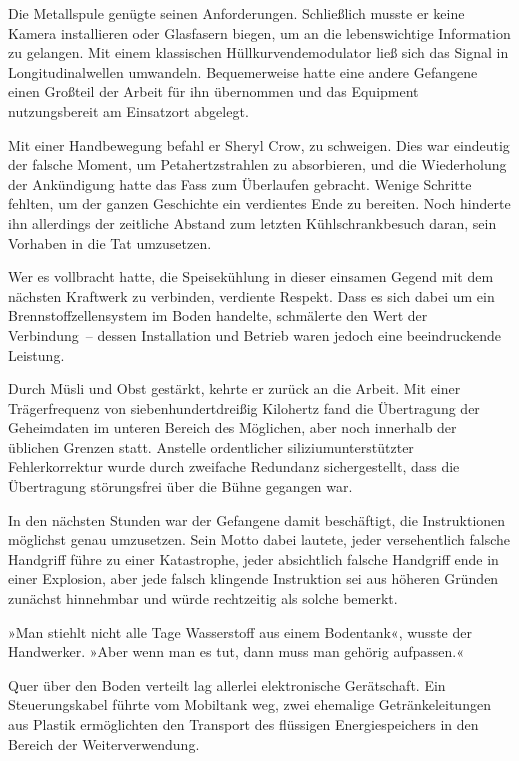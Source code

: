 Die Metallspule genügte seinen Anforderungen. Schließlich musste er keine Kamera installieren oder Glasfasern biegen, um an die lebenswichtige Information zu gelangen. Mit einem klassischen Hüllkurvendemodulator ließ sich das Signal in Longitudinalwellen umwandeln. Bequemerweise hatte eine andere Gefangene einen Großteil der Arbeit für ihn übernommen und das Equipment nutzungsbereit am Einsatzort abgelegt.

Mit einer Handbewegung befahl er Sheryl Crow, zu schweigen. Dies war eindeutig der falsche Moment, um Petahertzstrahlen zu absorbieren, und die Wiederholung der Ankündigung hatte das Fass zum Überlaufen gebracht. Wenige Schritte fehlten, um der ganzen Geschichte ein verdientes Ende zu bereiten. Noch hinderte ihn allerdings der zeitliche Abstand zum letzten Kühlschrankbesuch daran, sein Vorhaben in die Tat umzusetzen.

Wer es vollbracht hatte, die Speisekühlung in dieser einsamen Gegend mit dem nächsten Kraftwerk zu verbinden, verdiente Respekt. Dass es sich dabei um ein Brennstoffzellensystem im Boden handelte, schmälerte den Wert der Verbindung~– dessen Installation und Betrieb waren jedoch eine beeindruckende Leistung.

Durch Müsli und Obst gestärkt, kehrte er zurück an die Arbeit. Mit einer Trägerfrequenz von siebenhundertdreißig Kilohertz fand die Übertragung der Geheimdaten im unteren Bereich des Möglichen, aber noch innerhalb der üblichen Grenzen statt. Anstelle ordentlicher siliziumunterstützter Fehlerkorrektur wurde durch zweifache Redundanz sichergestellt, dass die Übertragung störungsfrei über die Bühne gegangen war.

In den nächsten Stunden war der Gefangene damit beschäftigt, die Instruktionen möglichst genau umzusetzen. Sein Motto dabei lautete, jeder versehentlich falsche Handgriff führe zu einer Katastrophe, jeder absichtlich falsche Handgriff ende in einer Explosion, aber jede falsch klingende Instruktion sei aus höheren Gründen zunächst hinnehmbar und würde rechtzeitig als solche bemerkt.

»Man stiehlt nicht alle Tage Wasserstoff aus einem Bodentank«, wusste der Handwerker. »Aber wenn man es tut, dann muss man gehörig aufpassen.«

Quer über den Boden verteilt lag allerlei elektronische Gerätschaft. Ein Steuerungskabel führte vom Mobiltank weg, zwei ehemalige Getränkeleitungen aus Plastik ermöglichten den Transport des flüssigen Energiespeichers in den Bereich der Weiterverwendung.


